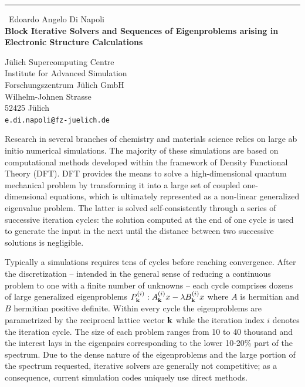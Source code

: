 \documentclass{report}
\begin{document}
\begin{center}
\rule{6in}{1pt} \
{\large Edoardo Angelo Di Napoli \\
{\bf Block Iterative Solvers and Sequences of Eigenproblems arising in Electronic Structure Calculations}}

J\"ulich Supercomputing Centre \\ Institute for Advanced Simulation \\ Forschungszentrum J\"ulich GmbH \\ Wilhelm-Johnen Strasse \\ 52425 J\"ulich
\\
{\tt e.di.napoli@fz-juelich.de}\end{center}

Research in several branches of chemistry and materials science
relies on large ab initio numerical simulations. The majority of these
simulations are based on computational methods developed within the
framework of Density Functional Theory (DFT). DFT provides the means to
solve a high-dimensional quantum mechanical problem by transforming it
into a large set of coupled one-dimensional equations, which is
ultimately represented as a non-linear generalized eigenvalue problem.
The latter is solved self-consistently through a series of successive
iteration cycles: the solution computed at the end of one cycle is used
to generate the input in the next until the distance between two
successive solutions is negligible.

Typically a simulations requires tens of cycles before reaching
convergence. After the discretization -- intended in the general sense of
reducing a continuous problem to one with a finite number of unknowns --
each cycle comprises dozens of large generalized eigenproblems
$P^{(i)}_{\bf k}: A^{(i)}_{\bf k} x - \lambda B^{(i)}_{\bf k} x$ where
$A$ is hermitian and $B$ hermitian positive definite. Within every cycle
the eigenproblems are parametrized by the reciprocal lattice vector ${\bf
k}$ while the iteration index $i$ denotes the iteration cycle. The size
of each problem ranges from 10 to 40 thousand and the interest lays in
the eigenpairs corresponding to the lower 10-20\% part of the spectrum.
Due to the dense nature of the eigenproblems and the large portion of the
spectrum requested, iterative solvers are generally not competitive; as a
consequence, current simulation codes uniquely use direct methods.
\end{document}
